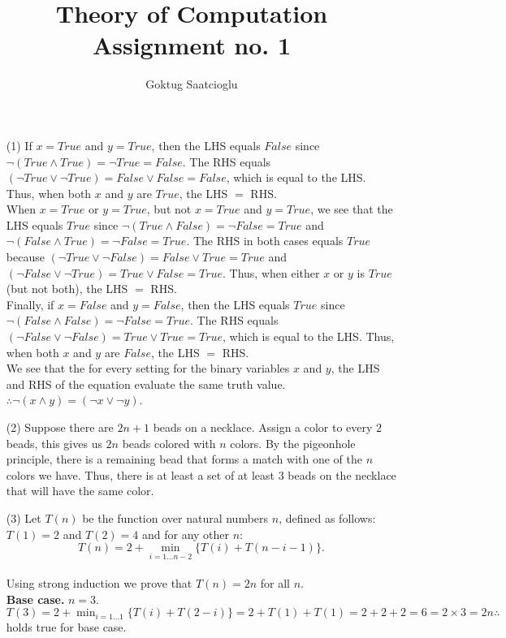 \documentclass [10pt]{article}
\begin{document}
\title{Theory of Computation Assignment no. 1}
\author{Goktug Saatcioglu}
\date{}
\maketitle
\begin{enumerate}
	\item[(1)]If $x = True$ and $y = True$, then the LHS equals $False$ since $\neg(True \land True) = \neg True = False$. The RHS equals $(\neg True \lor \neg True) = False \lor False = False$, which is equal to the LHS. Thus, when both $x$ and $y$ are $True$, the LHS $=$ RHS.\\ When $x = True$ or $y = True$, but not $x = True$ and $y = True$, we see that the LHS equals $True$ since $\neg(True \land False) = \neg False = True$ and $\neg(False \land True) = \neg False = True$. The RHS in both cases equals $True$ because $(\neg True \lor \neg False) = False \lor True = True$ and $(\neg False \lor \neg True) = True \lor False = True$. Thus, when either $x$ or $y$ is $True$ (but not both), the LHS $=$ RHS.\\ Finally, if $x = False$ and $y = False$, then the LHS equals $True$ since $\neg(False \land False) = \neg False = True$. The RHS equals $(\neg False \lor \neg False) = True \lor True = True$, which is equal to the LHS. Thus, when both $x$ and $y$ are $False$, the LHS $=$ RHS.\\ We see that the for every setting for the binary variables $x$ and $y$, the LHS and RHS of the equation evaluate the same truth value. $\therefore \neg(x \land y) = (\neg x \lor \neg y)$.
	\item[(2)]Suppose there are $2n+1$ beads on a necklace. Assign a color to every $2$ beads, this gives us $2n$ beads colored with $n$ colors. By the pigeonhole principle, there is a remaining bead that forms a match with one of the $n$ colors we have. Thus, there is at least a set of at least $3$ beads on the necklace that will have the same color.
	\item[(3)]Let $T(n)$ be the function over natural numbers $n$, defined as follows: $T(1) = 2$ and $T(2) = 4$ and for any other $n$: $$T(n) = 2 + \min_{i=1 \dots n-2} \{T(i) + T(n - i - 1)\}.$$\\ Using strong induction we prove that $T(n) = 2n$ for all $n$.\\
	\textbf{Base case.} $n = 3$.\\ $T(3) = 2 + \min_{i=1 \dots 1} \{T(i) + T(2 - i)\} = 2 + T(1) + T(1) = 2 + 2 + 2 = 6 = 2 \times 3 = 2n \therefore$ holds true for base case.\\

\end{enumerate}
\end{document}
